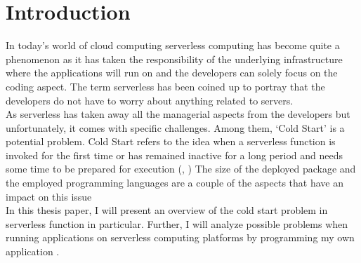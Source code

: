 %
\section{Introduction}\label{sec:introduction}
%
In today's world of cloud computing serverless computing has become quite a phenomenon as it has taken the responsibility of the underlying infrastructure where the applications will run on and the developers can solely focus on the coding aspect. The term serverless has been coined up to portray that the developers do not have to worry about anything related to servers.\\

As serverless has taken away all the managerial aspects from the developers but unfortunately, it comes with specific challenges. Among them, ‘Cold Start’ is a potential problem. Cold Start refers to the idea when a serverless function is invoked for the first time or has remained inactive for a long period and needs some time to be prepared for execution (\cite{MSD+19}, \cite{SA20}) The size of the deployed package and the employed programming languages are a couple of the aspects that have an impact on this issue \cite{MEH+18}\\

In this thesis paper, I will present an overview of the cold start problem in serverless function
 in particular. Further, I will analyze possible problems when running applications on serverless computing platforms by programming my own application \cite{CIM+19}.\\
